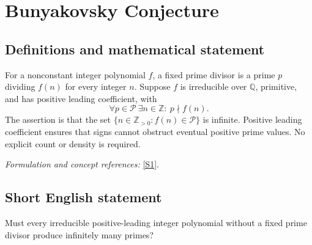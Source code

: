 \documentclass[11pt]{article}
\newcommand{\Z}{\mathbb{Z}}
\newcommand{\Q}{\mathbb{Q}}
\newcommand{\sref}[2]{\hyperlink{source:#1:#2}{[S#2]}}
\newif\ifshowcatalogue
\newcommand{\cataloguescope}[1]{\ifshowcatalogue
 \paragraph{Exact scope in the supplied catalogue.}
 \begin{quote}\small #1\end{quote}\fi}
\begin{document}
\setcounter{section}{0}
\clearpage
\section*{\texorpdfstring{Bunyakovsky Conjecture}{Bunyakovsky Conjecture}}\label{1292}
\subsection{Definitions and mathematical statement}
For a nonconstant integer polynomial $f$, a fixed prime divisor is a prime $p$ dividing $f(n)$ for every integer $n$. Suppose $f$ is irreducible over $\Q$, primitive, and has positive leading coefficient, with
\[
 \forall p\in\mathcal P\ \exists n\in\Z:\ p\nmid f(n).
\]
The assertion is that the set $\{n\in\Z_{>0}:f(n)\in\mathcal P\}$ is infinite. Positive leading coefficient ensures that signs cannot obstruct eventual positive prime values. No explicit count or density is required.
\par\smallskip\textit{Formulation and concept references:} \sref{1292}{1}.
\cataloguescope{Prove or disprove that every irreducible polynomial f in Z[x] with positive leading coefficient and no fixed prime divisor takes prime values for infinitely many positive integer inputs.}

\subsection{Short English statement}
Must every irreducible positive-leading integer polynomial without a fixed prime divisor produce infinitely many primes?
\end{document}
